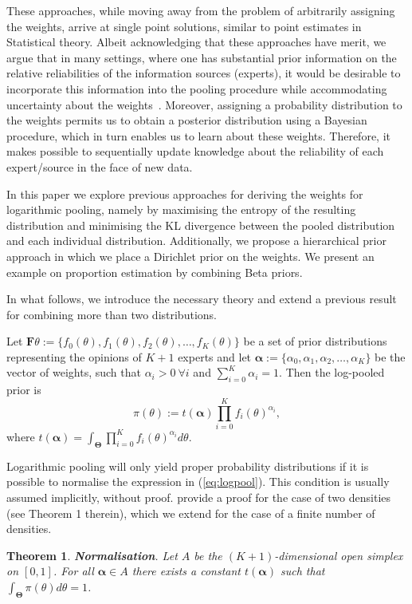 \documentclass[a4paper, notitlepage, 11pt]{article}
\newtheorem{theo}{Theorem}[]
\begin{document}
These approaches, while moving away from the problem of arbitrarily assigning the weights, arrive at single point solutions, similar to point estimates in Statistical theory.
Albeit acknowledging that these approaches have merit, we argue that in many settings, where one has substantial prior information on the relative reliabilities of the information sources (experts), it would be desirable to incorporate this information into the pooling procedure while accommodating uncertainty about the weights~\citep{poole2000}.
Moreover, assigning a probability distribution to the weights permits us to obtain a posterior distribution using a Bayesian procedure, which in turn enables us to learn about these weights.
Therefore, it makes possible to sequentially update knowledge about the reliability of each expert/source in the face of new data.

In this paper we explore previous approaches for deriving the weights for logarithmic pooling, namely by maximising the entropy of the resulting distribution and minimising the KL divergence between the pooled distribution and each individual distribution.
Additionally, we propose a hierarchical prior approach in which we place a Dirichlet prior on the weights.
We present an example on proportion estimation by combining Beta priors.

In what follows, we introduce the necessary theory and extend a previous 
result~\citep{poole2000} for combining more than two distributions.

Let $\mathbf{F}{\theta} := \{f_0(\theta), f_1(\theta), f_2(\theta), \ldots, f_K(\theta)\}$ be a set of prior distributions representing the opinions of $K+1$ experts and let $\boldsymbol\alpha :=\{\alpha_0, \alpha_1, \alpha_2, \ldots, \alpha_K \}$ be the vector of weights, such that $\alpha_i > 0\: \forall i$ and $\sum_{i=0}^K \alpha_i = 1$.
Then the log-pooled prior is
\begin{equation}
\label{eq:logpool}
 \pi(\theta) := t(\boldsymbol\alpha) \prod_{i=0}^K f_i(\theta)^{\alpha_i},
\end{equation}
where $t(\boldsymbol\alpha) = \int_{\boldsymbol\Theta}\prod_{i=0}^K f_i(\theta)^{\alpha_i}d\theta$.

Logarithmic pooling will only yield proper probability distributions if it is possible to normalise the expression in (\ref{eq:logpool}).
This condition is usually assumed implicitly, without proof.
\citet{poole2000} provide a proof for the case of two densities (see Theorem 1 therein), which we extend for the case of a finite number of densities.
\begin{theo}
\label{thm:normalisation}
\textbf{Normalisation}. 
Let $A$ be the $(K+1)$-dimensional open simplex on $[0,1]$.
For all $\boldsymbol\alpha \in A$ there exists a constant $t(\boldsymbol\alpha)$ such that $\int_{\boldsymbol\Theta}\pi(\theta)d\theta = 1$.
\end{theo}
\end{document}
